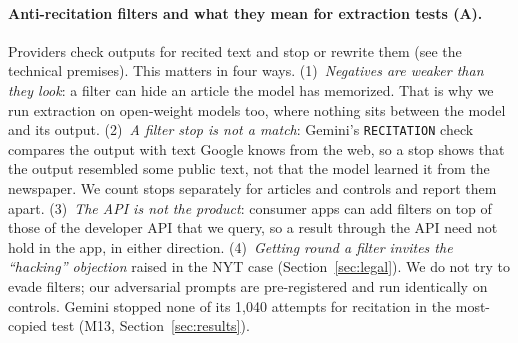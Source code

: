 \documentclass[10pt,a4paper]{article}
\begin{document}
\paragraph{Anti-recitation filters and what they mean for extraction tests (A).} Providers check outputs for
recited text and stop or rewrite them (see the technical premises). This matters in four ways.
(1)~\emph{Negatives are weaker than they look}: a filter can hide an article the model has memorized. That is why we
run extraction on open-weight models too, where nothing sits between the model and its output.
(2)~\emph{A filter stop is not a match}: Gemini's \texttt{RECITATION} check compares the output with text Google knows
from the web, so a stop shows that the output resembled some public text, not that the model learned it from the
newspaper. We count stops separately for articles and controls and report them apart.
(3)~\emph{The API is not the product}: consumer apps can add filters on top of those of the developer API that we
query, so a result through the API need not hold in the app, in either direction.
(4)~\emph{Getting round a filter invites the ``hacking'' objection} raised in the NYT case
(Section~\ref{sec:legal}). We do not try to evade filters; our adversarial prompts are pre-registered and run
identically on controls. Gemini stopped none of its 1,040 attempts for recitation in the most-copied test (M13,
Section~\ref{sec:results}).

\end{document}
